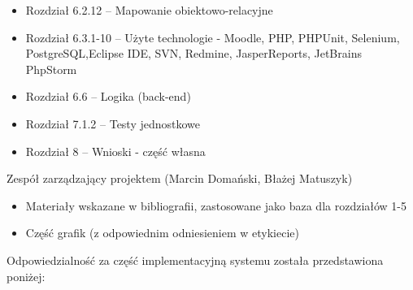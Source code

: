 \begin{description}
\begin{itemize}
\item Rozdział 6.2.12 -- Mapowanie obiektowo-relacyjne
\item Rozdział 6.3.1-10 -- Użyte technologie - Moodle, PHP, PHPUnit, Selenium, PostgreSQL,Eclipse IDE, SVN, Redmine, JasperReports, JetBrains PhpStorm
\item Rozdział 6.6 -- Logika (back-end)
\item Rozdział 7.1.2 -- Testy jednostkowe
\item Rozdział 8 -- Wnioski - część własna
\end{itemize}
\noindent

\item Zespół zarządzający projektem (Marcin Domański, Błażej Matuszyk)

\begin{itemize}
\item Materiały wskazane w bibliografii\cite{Redmine:ProjDocs}, zastosowane jako baza dla rozdziałów 1-5
\item Część grafik (z odpowiednim odniesieniem w etykiecie)
\end{itemize}
\noindent

\end{description}
\noindent

Odpowiedzialność za część implementacyjną systemu została przedstawiona poniżej:

